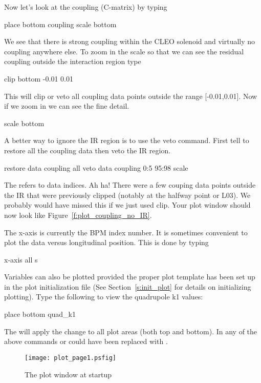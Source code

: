 Now let's look at the coupling (C-matrix) by typing
\begin{example}
  place bottom coupling
  scale bottom
\end{example}
We see that there is strong coupling within the CLEO solenoid and virtually no
coupling anywhere else. To zoom in the scale so that we can see the residual
coupling outside the interaction region type
\begin{example}
  clip bottom -0.01 0.01
\end{example}
This will clip or veto all coupling data points outside the range [-0.01,0.01].
Now if we zoom in we can see the fine detail.
\begin{example}
  scale bottom
\end{example}
A better way to ignore the IR region is to use the veto command. First tell \tao
to restore all the coupling data then veto the IR region.
\begin{example}
  restore data coupling all
  veto data coupling 0:5 95:98
  scale
\end{example}
The  refers to data indices. Ah ha! There were a few couping data points
outside the IR  that were previously
clipped (notably at the halfway point or L03). We probably would have missed
this if we just used clip. Your plot window should now look like
Figure~\ref{f:plot_coupling_no_IR}.

The x-axis is currently the BPM index number. It is sometimes convenient to plot
the data versus longitudinal position. This is done by typing
\begin{example}
  x-axis all s
\end{example}

Variables can also be plotted provided the proper plot template has been set up
in the plot initialization file (See Section~\ref{s:init_plot} for details on
initializing plotting). Type the following to view the quadrupole k1 values:
\begin{example}
  place bottom quad_k1
\end{example}

The  will apply the change to all plot areas (both top and bottom). In
any of the above commands  or  could have been replaced
with .

\begin{figure}
  \centering
  \texttt{[image: plot\_page1.psfig]}
  \caption{The plot window at startup}
  \label{f:plot_begin}
\end{figure}

